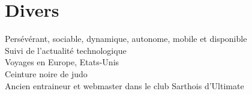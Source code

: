 \documentclass[]{friggeri-cv} %
\begin{document}







\section{Divers}
Persévérant, sociable, dynamique, autonome, mobile et disponible\\
Suivi de l’actualité technologique\\
Voyages en Europe, Etats-Unis\\
Ceinture noire de judo\\
Ancien entraineur et webmaster dans le club Sarthois d’Ultimate 
\end{document}

